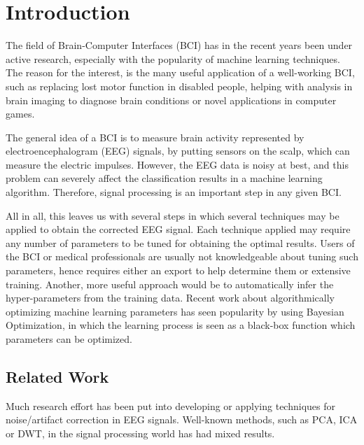 \section{Introduction}
The field of Brain-Computer Interfaces (BCI) has in the recent years been under active research, especially with the popularity of machine learning techniques. The reason for the interest, is the many useful application of a well-working BCI, such as replacing lost motor function in disabled people, helping with analysis in brain imaging to diagnose brain conditions or novel applications in computer games. 

The general idea of a BCI is to measure brain activity represented by electroencephalogram (EEG) signals, by putting sensors on the scalp, which can measure the electric impulses. However, the EEG data is noisy at best, and this problem can severely affect the classification results in a machine learning algorithm. Therefore, signal processing is an important step in any given BCI.

All in all, this leaves us with several steps in which several techniques may be applied to obtain the corrected EEG signal. Each technique applied may require any number of parameters to be tuned for obtaining the optimal results. Users of the BCI or medical professionals are usually not knowledgeable about tuning such parameters, hence requires either an export to help determine them or extensive training.
Another, more useful approach would be to automatically infer the hyper-parameters from the training data. Recent work about algorithmically optimizing machine learning parameters has seen popularity by using Bayesian Optimization, in which the learning process is seen as a black-box function which parameters can be optimized.

\subsection{Related Work}
Much research effort has been put into developing or applying techniques for noise/artifact correction in EEG signals. Well-known methods, such as PCA, ICA or DWT, in the signal processing world has had mixed results.
